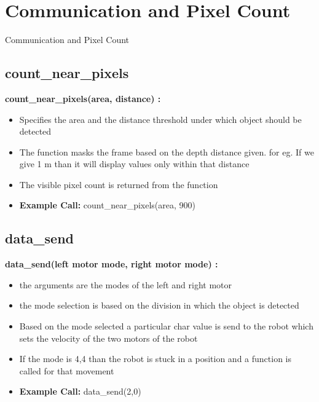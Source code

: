 \documentclass[10pt, a4paper]{beamer}
\begin{document}
\section{Communication and Pixel Count}
\begin{frame}[allowframebreaks]{Communication and Pixel Count}
  \subsection{count\_near\_pixels}
    \textbf{count\_near\_pixels(area, distance) : }
      \begin{itemize}
       \item Specifies the area and the distance threshold under which object should be detected
       \item The function masks the frame based on the depth distance given. for eg. If we give 1 m than it will display values only within that distance
       \item The visible pixel count is returned from the function
       \item \textbf{Example Call:} count\_near\_pixels(area, 900)
      \end{itemize}
\framebreak
  \subsection{data\_send}
    \textbf{data\_send(left motor mode, right motor mode) : }
      \begin{itemize}
       \item the arguments are the modes of the left and right motor
       \item the mode selection is based on the division in which the object is detected
       \item Based on the mode selected a particular char value is send to the robot which sets the velocity of the two motors of the robot
       \item If the mode is 4,4 than the robot is stuck in a position and a function is called for that movement
       \item \textbf{Example Call:} data\_send(2,0)
      \end{itemize}
\end{frame}
\end{document}
